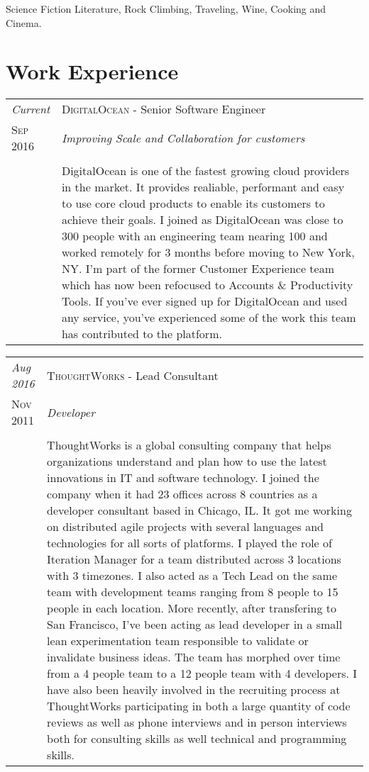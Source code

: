 \documentclass[letter,10pt]{article}
\begin{document}
Science Fiction Literature, Rock Climbing, Traveling, Wine, Cooking and Cinema.

\section{Work Experience}

\begin{tabular}{p{2.5cm}|p{13.5cm}}
  \emph{Current} & \textsc{DigitalOcean} - Senior Software Engineer\\
  \textsc{Sep 2016}& \emph{Improving Scale and Collaboration for customers}\\
  &\\
  &DigitalOcean is one of the fastest growing cloud providers in the market. It provides realiable, performant and easy to use core cloud products to enable its customers to achieve their goals. I joined as DigitalOcean was close to 300 people with an engineering team nearing 100 and worked remotely for 3 months before moving to New York, NY. I'm part of the former Customer Experience team which has now been refocused to Accounts \& Productivity Tools. If you've ever signed up for DigitalOcean and used any service, you've experienced some of the work this team has contributed to the platform.
\end{tabular}


\begin{tabular}{p{2.5cm}|p{13.5cm}}
  \emph{Aug 2016} & \textsc{ThoughtWorks} - Lead Consultant\\
  \textsc{Nov 2011}& \emph{Developer}\\
  &\\
  &ThoughtWorks is a global consulting company that helps organizations understand and plan how to use the latest innovations in IT and software technology. I joined the company when it had 23 offices across 8 countries as a developer consultant based in Chicago, IL. It got me working on distributed agile projects with several languages and technologies for all sorts of platforms. I played the role of Iteration Manager for a team distributed across 3 locations with 3 timezones. I also acted as a Tech Lead on the same team with development teams ranging from 8 people to 15 people in each location. More recently, after transfering to San Francisco, I've been acting as lead developer in a small lean experimentation team responsible to validate or invalidate business ideas. The team has morphed over time from a 4 people team to a 12 people team with 4 developers. I have also been heavily involved in the recruiting process at ThoughtWorks participating in both a large quantity of code reviews as well as phone interviews and in person interviews both for consulting skills as well technical and programming skills.
\end{tabular}
\end{document}
